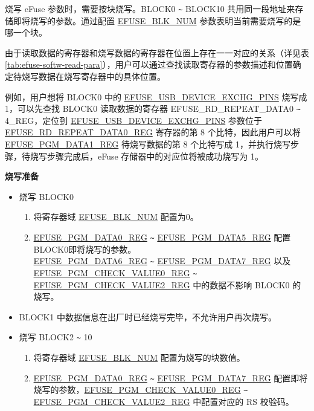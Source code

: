 \documentclass[main\_\_CN.tex]{subfiles}
\begin{document}
烧写 eFuse 参数时，需要按块烧写。BLOCK0 \verb+~+ BLOCK10 共用同一段地址来存储即将烧写的参数。通过配置 \hyperref[fielddesc:EFUSEBLKNUM]{EFUSE\_BLK\_NUM} 参数表明当前需要烧写的是哪一个块。

由于读取数据的寄存器和烧写数据的寄存器在位置上存在一一对应的关系（详见表 \ref{tab:efuse-softw-read-para}），用户可以通过查找读取寄存器的参数描述和位置确定待烧写数据在烧写寄存器中的具体位置。

例如，用户想将 BLOCK0 中的 \hyperref[fielddesc:EFUSEUSBDEVICEEXCHGPINS]{EFUSE\_USB\_DEVICE\_EXCHG\_PINS} 烧写成 1，可以先查找 BLOCK0 读取数据的寄存器 EFUSE\_RD\_REPEAT\_DATA0 \verb+~+ 4\_REG，定位到 \hyperref[fielddesc:EFUSEUSBDEVICEEXCHGPINS]{EFUSE\_USB\_DEVICE\_EXCHG\_PINS} 参数位于 \hyperref[regdesc:EFUSERDREPEATDATA0REG]{EFUSE\_RD\_REPEAT\_DATA0\_REG} 寄存器的第 8 个比特，因此用户可以将 \hyperref[regdesc:EFUSEPGMDATANREG]{EFUSE\_PGM\_DATA1\_REG} 待烧写数据的第 8 个比特写成 1，并执行烧写步骤，待烧写步骤完成后，eFuse 存储器中的对应位将被成功烧写为 1。

{\bfseries 烧写准备}

\begin{itemize}
    \item 烧写 BLOCK0
    \begin{enumerate}
        \item 将寄存器域 \hyperref[fielddesc:EFUSEBLKNUM]{EFUSE\_BLK\_NUM} 配置为0。
        \item \hyperref[regdesc:EFUSEPGMDATANREG]{EFUSE\_PGM\_DATA0\_REG} \verb+~+ \hyperref[regdesc:EFUSEPGMDATANREG]{EFUSE\_PGM\_DATA5\_REG} 配置BLOCK0即将烧写的参数。\\
        \hyperref[regdesc:EFUSEPGMDATANREG]{EFUSE\_PGM\_DATA6\_REG} \verb+~+ \hyperref[regdesc:EFUSEPGMDATANREG]{EFUSE\_PGM\_DATA7\_REG} 以及\\ \hyperref[regdesc:EFUSEPGMCHECKVALUENREG]{EFUSE\_PGM\_CHECK\_VALUE0\_REG} \verb+~+ \hyperref[regdesc:EFUSEPGMCHECKVALUENREG]{EFUSE\_PGM\_CHECK\_VALUE2\_REG} 中的数据不影响 BLOCK0 的烧写。
    \end{enumerate}
    \item BLOCK1 中数据信息在出厂时已经烧写完毕，不允许用户再次烧写。

    \item 烧写 BLOCK2 \verb+~+ 10
    \begin{enumerate}
        \item 将寄存器域 \hyperref[fielddesc:EFUSEBLKNUM]{EFUSE\_BLK\_NUM} 配置为烧写的块数值。
        \item \hyperref[regdesc:EFUSEPGMDATANREG]{EFUSE\_PGM\_DATA0\_REG} \verb+~+ \hyperref[regdesc:EFUSEPGMDATANREG]{EFUSE\_PGM\_DATA7\_REG} 配置即将烧写的参数，\hyperref[regdesc:EFUSEPGMCHECKVALUENREG]{EFUSE\_PGM\_CHECK\_VALUE0\_REG}  \verb+~+ \hyperref[regdesc:EFUSEPGMCHECKVALUENREG]{EFUSE\_PGM\_CHECK\_VALUE2\_REG} 中配置对应的 RS 校验码。
    \end{enumerate}
\end{itemize}
\end{document}
